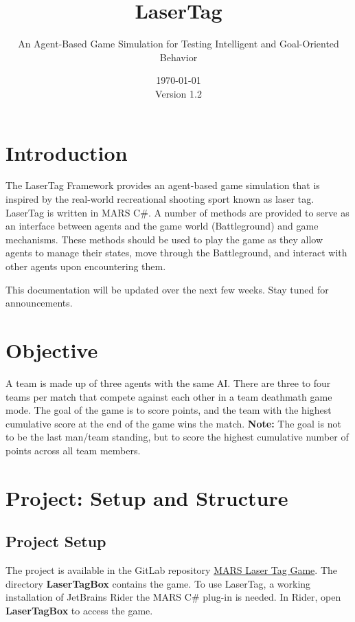 \documentclass[
    a4paper,
    english,
    DIV=16,
    11pt,
    parskip=half,
    listof=totoc,		%
    index=totoc,		%
    bibliography=totoc,	%
]{scrartcl}
\title{LaserTag}
\subtitle{An Agent-Based Game Simulation for Testing Intelligent and Goal-Oriented Behavior}
\date{\today\\Version 1.2}
\begin{document}
\maketitle


\tableofcontents


\clearpage
\section{Introduction}
The LaserTag Framework provides an agent-based game simulation that is inspired by the real-world recreational shooting sport known as laser tag. LaserTag is written in MARS C\#. A number of methods are provided to serve as an interface between agents and the game world (Battleground) and game mechanisms. These methods should be used to play the game as they allow agents to manage their states, move through the Battleground, and interact with other agents upon encountering them.

This documentation will be updated over the next few weeks. Stay tuned for announcements.

\section{Objective} \label{objective}
A team is made up of three agents with the same AI. There are three to four teams per match that compete against each other in a team deathmath game mode. The goal of the game is to score points, and the team with the highest cumulative score at the end of the game wins the match. \textbf{Note:} The goal is not to be the last man/team standing, but to score the highest cumulative number of points across all team members.


\section{Project: Setup and Structure}

\subsection{Project Setup}
\label{projsetup}
The project is available in the GitLab repository \href{https://git.haw-hamburg.de/mars/mars-laser-tag-game}{MARS Laser Tag Game}. The directory \textbf{LaserTagBox} contains the game. To use LaserTag, a working installation of JetBrains Rider the MARS C\# plug-in is needed. In Rider, open \textbf{LaserTagBox} to access the game.
\end{document}
